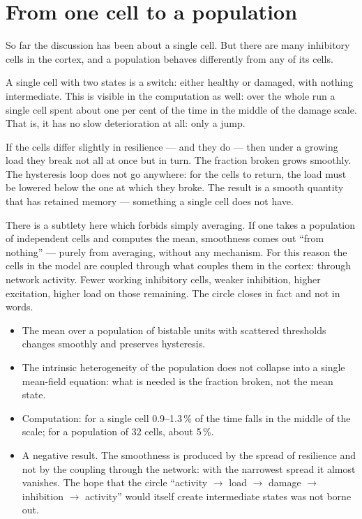 \section{From one cell to a population}\label{sec:pop}

So far the discussion has been about a single cell. But there are many inhibitory cells in the cortex, and a population behaves differently from any of its cells.

A single cell with two states is a switch: either healthy or damaged, with nothing intermediate. This is visible in the computation as well: over the whole run a single cell spent about one per cent of the time in the middle of the damage scale. That is, it has no slow deterioration at all: only a jump.

If the cells differ slightly in resilience --- and they do --- then under a growing load they break not all at once but in turn. The fraction broken grows smoothly. The hysteresis loop does not go anywhere: for the cells to return, the load must be lowered below the one at which they broke. The result is a smooth quantity that has retained memory --- something a single cell does not have.

There is a subtlety here which forbids simply averaging. If one takes a population of independent cells and computes the mean, smoothness comes out ``from nothing'' --- purely from averaging, without any mechanism. For this reason the cells in the model are coupled through what couples them in the cortex: through network activity. Fewer working inhibitory cells, weaker inhibition, higher excitation, higher load on those remaining. The circle closes in fact and not in words.

\facts
\begin{itemize}
\item The mean over a population of bistable units with scattered thresholds changes smoothly and preserves hysteresis.\tP
\item The intrinsic heterogeneity of the population does not collapse into a single mean-field equation: what is needed is the fraction broken, not the mean state.\tP
\item Computation: for a single cell 0.9--1.3\,\% of the time falls in the middle of the scale; for a population of 32 cells, about 5\,\%.\tD
\item A negative result. The smoothness is produced by the spread of resilience and not by the coupling through the network: with the narrowest spread it almost vanishes. The hope that the circle ``activity $\to$ load $\to$ damage $\to$ inhibition $\to$ activity'' would itself create intermediate states was not borne out.\tD
\end{itemize}

